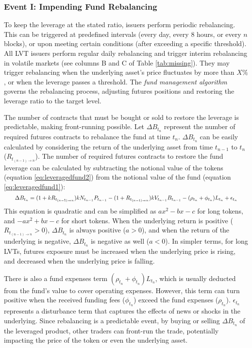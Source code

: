 \subsubsection{Event I: Impending Fund Rebalancing}\label{subsec:rebalancing}
To keep the leverage at the stated ratio, issuers perform periodic rebalancing. This can be triggered at predefined intervals (\eg every day, every 8 hours, or every $n$ blocks), or upon meeting certain conditions (\eg after exceeding a specific threshold). All LVT issuers perform regular daily rebalancing and trigger interim rebalancing in volatile markets (see columns B and C of Table \ref{tab:missing}). They may trigger rebalancing when the underlying asset's price fluctuates by more than $X\%$, or when the leverage passes a threshold. The \textsl{fund management algorithm} governs the rebalancing process, adjusting futures positions and restoring the leverage ratio to the target level.

The number of contracts that must be bought or sold to restore the leverage is predictable, making front-running possible. Let $\Delta B_{t_{n}}$ represent the number of required futures contracts to rebalance the fund at time $t_{n}$. $\Delta B_{t_{n}}$ can be easily calculated by considering the return of the underlying asset from time $t_{n-1}$ to $t_{n}$ ($R_{t_{(n-1)\to n}}$). The number of required futures contracts to restore the fund leverage can be calculated by subtracting the notional value of the tokens (equation \ref{eq:leveragedfund2}) from the notional value of the fund (equation \ref{eq:leveragedfund1}):
\begin{equation*}
	\resizebox{.95\hsize}{!}{$
		\Delta{B_{t_{n}}}=(1+kR_{t_{(n-1)\to n}})kN_{t_{n-1}}P_{t_{n-1}}-(1+R_{t_{(n-1)\to n}})kV_{t_{n-1}}B_{t_{n-1}}-(\rho_{t_{n}}+\phi_{t_{n}})L_{t_{n}}+\epsilon_{t_{n}}
		$}
\end{equation*}
This equation is quadratic and can be simplified as $ax^2 - bx - c$ for long tokens, and $-ax^2 + bx - c$ for short tokens. When the underlying return is positive ($R_{t_{(n-1)\to n}} > 0$), $\Delta{B_{t_{n}}}$ is always positive ($a > 0$), and when the return of the underlying is negative, $\Delta{B_{t_{n}}}$ is negative as well ($a < 0$). In simpler terms, for long LVTs, futures exposure must be increased when the underlying price is rising, and decreased when the underlying price is falling.

There is also a fund expenses term $(\rho_{t_{n}} + \phi_{t_{n}})L_{t_{n}}$, which is usually deducted from the fund's value to cover operating expenses. However, this term can turn positive when the received funding fees ($\phi_{t_{n}}$) exceed the fund expenses ($\rho_{t_{n}}$). $\epsilon_{t_{n}}$ represents a disturbance term that captures the effects of news or shocks in the underlying. Since rebalancing is a predictable event, by buying or selling $\Delta{B_{t_{n}}}$ of the leveraged product, other traders can front-run the trade, potentially impacting the price of the token or even the underlying asset.

